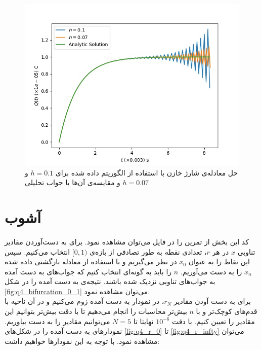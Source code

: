 \documentclass[11pt, a4paper]{article}
\begin{document}
\begin{figure}
  \centering
  \includegraphics[width=.7\textwidth]{q3_0_8.333333333333334.jpg}
  \caption{حل معادله‌ی شارژ خازن با استفاده از الگوریتم داده شده برای $h = 0.1$ و $h = 0.07$ و مقایسه‌ی‌ آن‌ها با جواب تحلیلی}
  \label{fig:q3_q_t}
\end{figure}


\section{\textbf{آشوب}}
کد این بخش از تمرین را در فایل‌
می‌توان مشاهده نمود.
برای به دست‌آوردن مقادیر تناوبی
$x$
در هر
$r$،
تعدادی نقطه به طور تصادفی از بازه‌ی
$[0, 1)$
انتخاب می‌کنیم.
سپس این نقاط را به عنوان
$x_0$
در نظر می‌گیریم و با استفاده از معادله بازگشتی داده شده
$x_n$
را به دست می‌آوریم.
$n$
را باید به گونه‌ای انتخاب کنیم که جواب‌های به دست آمده به جواب‌های تناوبی نزدیک شده باشند.
نتیجه‌ی به دست آمده را در شکل
\ref{fig:q4_bifurcation_0_1}
می‌توان مشاهده نمود.
\\
برای به دست آودن مقادیر
$r_N$،
در نمودار به دست آمده زوم می‌کنیم و در آن‌ ناحیه با قدم‌های کوچک‌تر و با
$n$
بیش‌تر محاسبات را انجام می‌دهیم تا با دقت بیش‌تر بتوانیم این مقادیر را تعیین کنیم.
با دقت
$10^{-6}$
نهایتا تا
$N = 5$
می‌توانیم مقادیر را به دست بیاوریم.
نمودارهای به دست آمده را در شکل‌های
\ref{fig:q4_r_0}‌
تا
\ref{fig:q4_r_infty}
می‌توان مشاهده نمود.
با توجه به این نمودارها خواهیم داشت:
\end{document}
